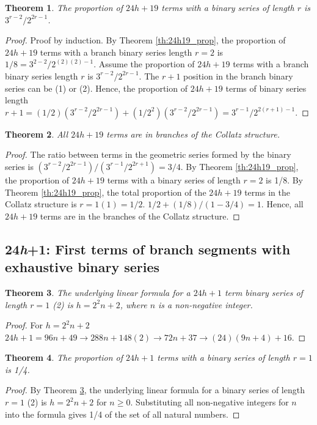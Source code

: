 \documentclass[sn-mathphys-num, pdflatex]{sn-jnl}
\newtheorem{theorem}{Theorem}[section]
\begin{document}
\begin{theorem}
    The proportion of $24h+19$ terms with a binary series of length $r$ is $3^{r-2}/2^{2r-1}$.
\end{theorem}
\begin{proof}
    Proof by induction.
    By Theorem \ref{th:24h19_prop}, the proportion of $24h+19$ terms with a branch binary series length $r=2$ is $1/8 = 3^{2-2}/2^{(2)(2)-1}$.
    Assume the proportion of $24h+19$ terms with a branch binary series length $r$ is $3^{r-2}/2^{2r-1}$.
    The $r+1$ position in the branch binary series can be (1) or (2).
    Hence, the proportion of $24h+19$ terms of binary series length $r+1 = (1/2)(3^{r-2}/2^{2r-1})+(1/2^2)(3^{r-2}/2^{2r-1}) = 3^{r-1}/2^{2(r+1)-1}$. 
\end{proof}
\begin{theorem}\label{th:24h19_final}
    All $24h+19$ terms are in branches of the Collatz structure.
\end{theorem}
\begin{proof}
    The ratio between terms in the geometric series formed by the binary series is $(3^{r-2}/2^{2r-1}) / (3^{r-1}/2^{2r+1}) = 3/4$.
    By Theorem \ref{th:24h19_prop}, the proportion of $24h+19$ terms with a binary series of length $r=2$ is 1/8.
    By Theorem \ref{th:24h19_prop}, the total proportion of the $24h+19$ terms in the Collatz structure is $r=1 (1) = 1/2$. $1/2+(1/8)/(1 - 3/4) = 1$.
    Hence, all $24h+19$ terms are in the branches of the Collatz structure.
\end{proof}

\subsection{24\textit{h}+1: First terms of branch segments with exhaustive binary series}\label{sec6.5}
\begin{theorem}\label{th:24h1_base}
    The underlying linear formula for a $24h+1$ term binary series of length $r=1$ (2) is $h=2^2n+2$, where $n$ is a non-negative integer.
\end{theorem}
\begin{proof}
    For $h=2^2n+2$ $24h+1 = 96n+49\to 288n+148(2)\to 72n+37\to (24)(9n+4)+16$. 
\end{proof}
\begin{theorem}\label{th:24h1_prop}
    The proportion of $24h+1$ terms with a binary series of length $r=1$ is 1/4.
\end{theorem}
\begin{proof}
    By Theorem \ref{th:24h1_base}, the underlying linear formula for a binary series of length $r=1$ (2) is $h=2^2n+2$ for $n \ge 0$. Substituting all non-negative integers for $n$ into the formula gives 1/4 of the set of all natural numbers.
\end{proof}
\end{document}
